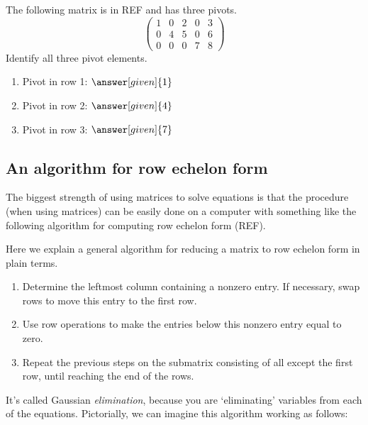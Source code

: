 \documentclass{ximera}
\begin{document}
\begin{question}
  The following matrix is in REF and has three pivots.
  \[
    \begin{pmatrix}
      1 & 0 & 2 & 0 & 3 \\
      0 & 4 & 5 & 0 & 6 \\
      0 & 0 & 0 & 7 & 8
    \end{pmatrix}
  \]
  Identify all three pivot elements.
  \begin{enumerate}
  \item Pivot in row 1: $\answer[given]{1}$
  \item Pivot in row 2: $\answer[given]{4}$
  \item Pivot in row 3: $\answer[given]{7}$
  \end{enumerate}
\end{question}


\subsection{An algorithm for row echelon form}

The biggest strength of using matrices to solve equations is that the
procedure (when using matrices) can be easily done on a computer with
something like the following algorithm for computing row echelon form
(REF).

\begin{algorithm}
  Here we explain a general algorithm for reducing a matrix to row
  echelon form in plain terms.
  \begin{enumerate}
  \item Determine the leftmost column containing a nonzero entry. If
    necessary, swap rows to move this entry to the first row.
  \item Use row operations to make the entries below this nonzero
    entry equal to zero.
  \item Repeat the previous steps on the submatrix consisting of all
    except the first row, until reaching the end of the rows.
  \end{enumerate}
\end{algorithm}

It's called Gaussian \textit{elimination}, because you are
`eliminating' variables from each of the equations.  Pictorially, we
can imagine this algorithm working as follows:
\end{document}
